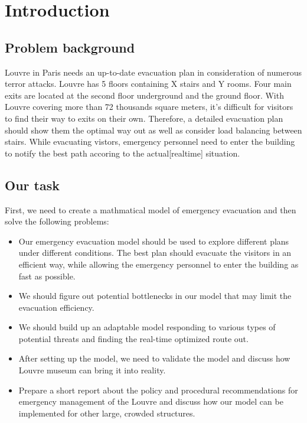 \documentclass{mcmthesis}
\begin{document}
\section{Introduction}
\subsection{Problem background}
Louvre in Paris needs an up-to-date evacuation plan in consideration of numerous terror attacks. 
Louvre has 5 floors containing X stairs and Y rooms. Four main exits are located at the second floor underground and the ground floor. With Louvre covering more than 72 thousands square meters, it's difficult for visitors to find their way to exits on their own. Therefore, a detailed evacuation plan should show them the optimal way out as well as consider load balancing between stairs. While evacuating vistors, emergency personnel need to enter the building to notify the best path accoring to the actual[realtime] situation.

\subsection{Our task}
First, we need to create a mathmatical model of emergency evacuation and then solve the following problems:
\begin{itemize}
\item Our emergency evacuation model should be used to explore different plans under different conditions. The best plan should evacuate the visitors in  an efficient way, while allowing the emergency personnel to enter the building as fast as possible.
\item We should figure out potential bottlenecks in our model that may limit the evacuation efficiency.
\item We should build up an adaptable model responding to various types of potential threats and finding the real-time optimized route out.
\item After setting up the model, we need to validate the model and discuss how Louvre museum can bring it into reality.
\item Prepare a short report about the policy and procedural recommendations for emergency management of the Louvre and discuss how our model can be implemented for other large, crowded structures. 

\end{itemize}
\end{document}
